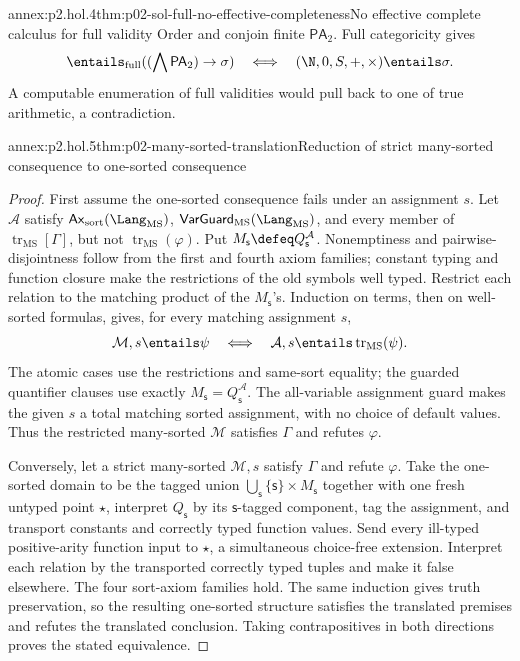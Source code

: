 \begin{annexitem}{annex:p2.hol.4}{thm:p02-sol-full-no-effective-completeness}{No effective complete calculus for full validity}
Order and conjoin finite \(\mathsf{PA}_2\).  Full categoricity gives
\[
 \entails_{\mathrm{full}}((\bigwedge\mathsf{PA}_2)\to\sigma)
 \quad\Longleftrightarrow\quad
 (\N,0,S,+,\times)\entails\sigma.
\]
A computable enumeration of full validities would pull back to one of true
arithmetic, a contradiction.
\end{annexitem}

\begin{annexitem}{annex:p2.hol.5}{thm:p02-many-sorted-translation}{Reduction of strict many-sorted consequence to one-sorted consequence}
\begin{proof}
First assume the one-sorted consequence fails under an assignment \(s\).  Let
\(\mathcal A\) satisfy \(\mathsf{Ax}_{\mathrm{sort}}(\Lang_{\mathrm{MS}})\),
\(\mathsf{VarGuard}_{\mathrm{MS}}(\Lang_{\mathrm{MS}})\), and every member of
\(\operatorname{tr}_{\mathrm{MS}}[\Gamma]\), but not
\(\operatorname{tr}_{\mathrm{MS}}(\varphi)\).  Put
\(M_{\mathsf s}\defeq Q_{\mathsf s}^{\mathcal A}\).  Nonemptiness and pairwise-disjointness
follow from the first and fourth axiom families; constant typing and function
closure make the restrictions of the old symbols well typed.  Restrict each
relation to the matching product of the \(M_{\mathsf s}\)'s.  Induction on terms, then
on well-sorted formulas, gives, for every matching assignment \(s\),
\[
 \mathcal M,s\entails\psi
 \quad\Longleftrightarrow\quad
 \mathcal A,s\entails\operatorname{tr}_{\mathrm{MS}}(\psi).
\]
The atomic cases use the restrictions and same-sort equality; the guarded
quantifier clauses use exactly
\(M_{\mathsf s}=Q_{\mathsf s}^{\mathcal A}\).  The all-variable assignment
guard makes the given \(s\) a total matching sorted assignment, with no choice
of default values.  Thus the restricted many-sorted \(\mathcal M\) satisfies
\(\Gamma\) and refutes \(\varphi\).

Conversely, let a strict many-sorted \(\mathcal M,s\) satisfy \(\Gamma\) and
refute \(\varphi\).  Take the one-sorted domain to be the tagged union
\(\bigcup_{\mathsf s}\{\mathsf s\}\times M_{\mathsf s}\) together with one
fresh untyped point \(\star\), interpret
\(Q_{\mathsf s}\) by its \(\mathsf s\)-tagged
component, tag the assignment, and transport constants and correctly typed
function values.  Send every ill-typed positive-arity function input to
\(\star\), a simultaneous choice-free extension.
Interpret each relation by the transported correctly typed tuples and make it
false elsewhere.  The four sort-axiom families hold.  The same induction gives
truth preservation, so the resulting one-sorted structure satisfies the
translated premises and refutes the translated conclusion.  Taking
contrapositives in both directions proves the stated equivalence.
\end{proof}
\end{annexitem}

